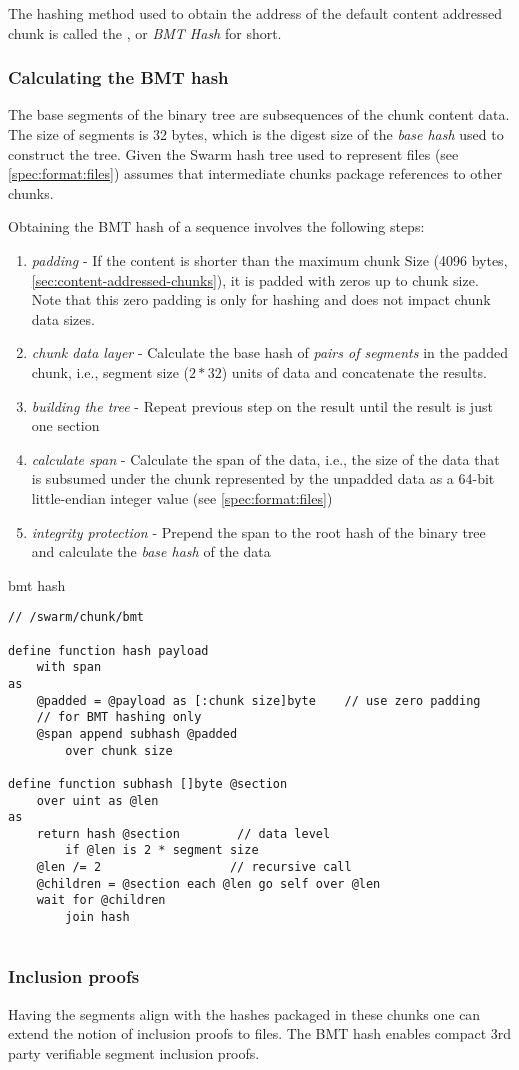 The hashing method used to obtain the address of the default content addressed chunk is called the , or \emph{BMT Hash} for short. 

\subsubsection{Calculating the BMT hash}

The base segments of the binary tree are subsequences of the chunk content data. 
The size of segments is 32  bytes, which is the digest size of the \emph{base hash} used to construct the tree. 
Given the Swarm hash tree used to represent files (see \ref{spec:format:files}) assumes that intermediate chunks package references to other chunks. 

Obtaining the BMT hash of a sequence involves the following steps:

\begin{enumerate}
\item \emph{padding} - If the content is shorter than the maximum chunk Size  (4096 bytes, \ref{sec:content-addressed-chunks}), it is padded with zeros up to chunk size. Note that this zero padding is only for hashing and does not impact chunk data sizes.
\item \emph{chunk data layer} - Calculate the base hash of \emph{pairs of segments} in the padded chunk, i.e., segment size ($2 * 32$) units of data and concatenate the results.
\item \emph{building the tree} - Repeat previous step on the result until the result is just one section
\item \emph{calculate span} - Calculate the span of the data, i.e., the size of the data that is subsumed under the chunk represented by the unpadded data as a 64-bit little-endian integer value (see  \ref{spec:format:files})            
\item \emph{integrity protection} - Prepend the span to the root hash of the binary tree and calculate the \emph{base hash} of the data
\end{enumerate}

\begin{definition}{bmt hash}\label{def:bmt-hash}
\begin{lstlisting}[language=buzz1]
// /swarm/chunk/bmt

define function hash payload 
    with span
as
    @padded = @payload as [:chunk size]byte    // use zero padding 
    // for BMT hashing only
    @span append subhash @padded 
        over chunk size 
    
define function subhash []byte @section
    over uint as @len
as
    return hash @section        // data level
        if @len is 2 * segment size
    @len /= 2                  // recursive call
    @children = @section each @len go self over @len
    wait for @children 
        join hash
    

\end{lstlisting}
\end{definition}

\subsubsection{Inclusion proofs}

Having the segments align with the hashes packaged in these chunks one can extend the notion of inclusion proofs to files.
The BMT hash enables compact 3rd party verifiable segment inclusion proofs.

